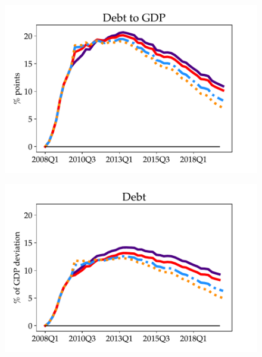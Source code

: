 \begin{figure}[t!]
\medskip
\begin{minipage}{0.51\textwidth}
\includegraphics[scale=.57]{text/chapter1/Figures/Fiscal_Consolidation_CounterFactual/debt2GDP_CounterFactual_Fiscal_Consolidation_no_ZLB_lower}
\label{fig:c}
\end{minipage}\hspace*{\fill}
\begin{minipage}{0.51\textwidth}
\includegraphics[scale=.57]{text/chapter1/Figures/Fiscal_Consolidation_CounterFactual/debt_CounterFactual_Fiscal_Consolidation_no_ZLB_lower}
 \label{fig:d}
\end{minipage}


\end{figure}
